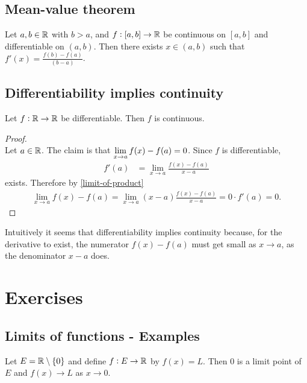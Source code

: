 \subsection{Mean-value theorem}
\begin{theorem*}
  Let $a, b \in \mathbb{R}$ with $b > a$, and $f:[a,b] \to \mathbb{R}$ be continuous on $[a, b]$ and differentiable
  on $(a, b)$. Then there exists $x \in (a, b)$ such that $f'(x) = \frac{f(b) - f(a)}{(b - a)}$.
\end{theorem*}


\subsection{Differentiability implies continuity}
\begin{theorem*}
  Let $f:\mathbb{R}\to\mathbb{R}$ be differentiable. Then $f$ is continuous.
\end{theorem*}

\begin{proof}~\\
  Let $a \in \mathbb{R}$. The claim is that $\lim\limits_{x \to a} f(x) - f(a) = 0$. Since $f$ is differentiable,
  \begin{align*}
    f'(a) &= \lim_{x \to a} \frac{f(x) - f(a)}{x - a}
  \end{align*}
  exists. Therefore by \eqref{limit-of-product}
  \begin{align*}
    \lim_{x \to a} f(x) - f(a) = \lim_{x \to a} (x - a)\frac{f(x) - f(a)}{x - a} = 0\cdot f'(a) = 0.
  \end{align*}
\end{proof}

\begin{remark*}
  Intuitively it seems that differentiability implies continuity because, for the derivative to
  exist, the numerator $f(x) - f(a)$ must get small as $x\to a$, as the denominator $x - a$ does.
\end{remark*}


\newpage
\section{Exercises}

\subsection{Limits of functions - Examples}

\begin{example}
  Let $E = \mathbb{R}\setminus \{0\}$ and define $f:E \to \mathbb{R}$ by $f(x) = L$. Then 0 is a limit point of
  $E$ and $f(x) \to L$ as $x \to 0$.
\end{example}

